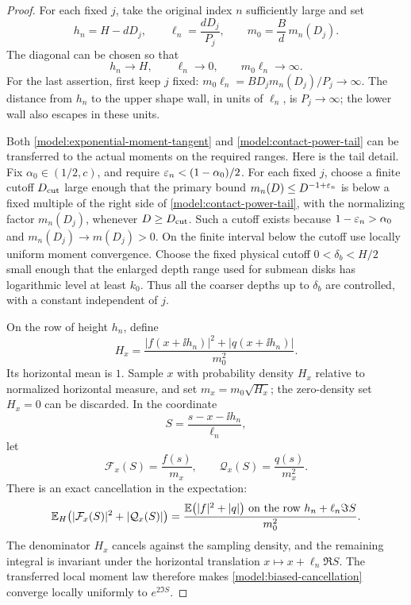 \begin{proof}
For each fixed \(j\), take the original index \(n\) sufficiently large
and set
\begin{equation}
\label{model:contact-physical-scales}
 h_n=H-dD_j,\qquad
 \ell_n=\frac{dD_j}{P_j},\qquad
 m_0=\frac Bd\,m_n(D_j).
\end{equation}
The diagonal can be chosen so that
\[
 h_n\to H,\qquad \ell_n\to0,\qquad
 m_0\ell_n\to\infty.
\]
For the last assertion, first keep \(j\) fixed:
\(m_0\ell_n=B D_jm_n(D_j)/P_j\to\infty\).
The distance from \(h_n\) to the upper shape wall, in units of
\(\ell_n\), is \(P_j\to\infty\); the lower wall also escapes in
these units.

Both \eqref{model:exponential-moment-tangent} and
\eqref{model:contact-power-tail} can be transferred to the actual
moments on the required ranges.  Here is the tail detail.  Fix
\(\alpha_0\in(1/2,c)\), and require
\(\varepsilon_n<(1-\alpha_0)/2\).  For each fixed \(j\), choose a finite
cutoff \(D_{\rm cut}\) large enough that the primary bound
\(m_n(D)\le D^{-1+\varepsilon_n}\) is below a fixed multiple of the
right side of \eqref{model:contact-power-tail}, with the
normalizing factor \(m_n(D_j)\), whenever \(D\ge D_{\rm cut}\).
Such a cutoff exists because \(1-\varepsilon_n>\alpha_0\) and
\(m_n(D_j)\to m(D_j)>0\).  On the finite interval below the cutoff
use locally uniform moment convergence. Choose the fixed physical
cutoff \(0<\delta_b<H/2\) small enough that the enlarged depth range
used for submean disks has logarithmic level at least \(k_0\).
Thus all the coarser depths up to \(\delta_b\)
are controlled, with a constant independent of \(j\).

On the row of height \(h_n\), define
\[
 H_x=\frac{|f(x+\ii h_n)|^2+|q(x+\ii h_n)|}{m_0^2}.
\]
Its horizontal mean is \(1\).  Sample \(x\) with probability density
\(H_x\) relative to normalized horizontal measure, and set
\(m_x=m_0\sqrt{H_x}\); the zero-density set \(H_x=0\) can be
discarded.  In the coordinate
\[
 S=\frac{s-x-\ii h_n}{\ell_n},
\]
let
\[
 \mathcal F_x(S)=\frac{f(s)}{m_x},\qquad
 \mathcal Q_x(S)=\frac{q(s)}{m_x^2}.
\]
There is an exact cancellation in the expectation:
\begin{equation}
\label{model:biased-cancellation}
 \mathbb E_H\bigl(|\mathcal F_x(S)|^2+|\mathcal Q_x(S)|\bigr)
 =
 \frac{\mathbb E\bigl(|f|^2+|q|\bigr)
       \text{ on the row }h_n+\ell_n\Im S}{m_0^2}.
\end{equation}
The denominator \(H_x\) cancels against the sampling density,
and the remaining integral is invariant under the horizontal
translation \(x\mapsto x+\ell_n\Re S\).  The transferred local
moment law therefore makes \eqref{model:biased-cancellation}
converge locally uniformly to \(e^{2\Im S}\).


\end{proof}
